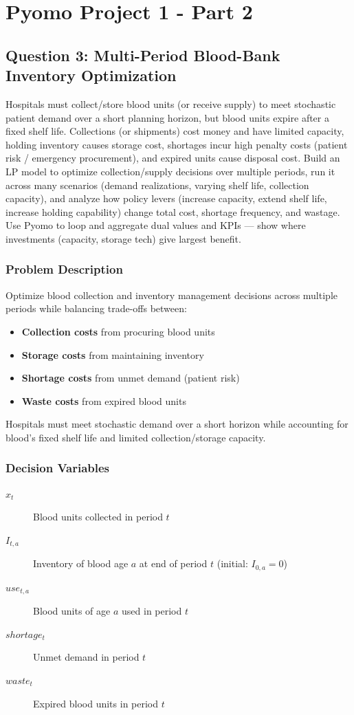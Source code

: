 \documentclass{KPS_assignment}
\begin{document}
\section*{Pyomo Project 1 - Part 2}
\subsection*{Question 3: Multi-Period Blood-Bank Inventory Optimization}
Hospitals must collect/store blood units (or receive supply) to meet stochastic patient demand over a short planning horizon, but blood units expire after a fixed shelf life. Collections (or shipments) cost money and have limited capacity, holding inventory causes storage cost, shortages incur high penalty costs (patient risk / emergency procurement), and expired units cause disposal cost. Build an LP model to optimize collection/supply decisions over multiple periods, run it across many scenarios (demand realizations, varying shelf life, collection capacity), and analyze how policy levers (increase capacity, extend shelf life, increase holding capability) change total cost, shortage frequency, and wastage. Use Pyomo to loop and aggregate dual values and KPIs — show where investments (capacity, storage tech) give largest benefit.

\subsubsection*{Problem Description}

Optimize blood collection and inventory management decisions across multiple periods while balancing trade-offs between:
\begin{itemize}
    \item \textbf{Collection costs} from procuring blood units
    \item \textbf{Storage costs} from maintaining inventory
    \item \textbf{Shortage costs} from unmet demand (patient risk)
    \item \textbf{Waste costs} from expired blood units
\end{itemize}

Hospitals must meet stochastic demand over a short horizon while accounting for blood's fixed shelf life and limited collection/storage capacity.

\subsubsection*{Decision Variables}
\begin{description}
    \item[$x_t$] Blood units collected in period $t$
    \item[$I_{t,a}$] Inventory of blood age $a$ at end of period $t$ (initial: $I_{0,a} = 0$)
    \item[$use_{t,a}$] Blood units of age $a$ used in period $t$
    \item[$shortage_t$] Unmet demand in period $t$
    \item[$waste_t$] Expired blood units in period $t$
\end{description}
\end{document}
